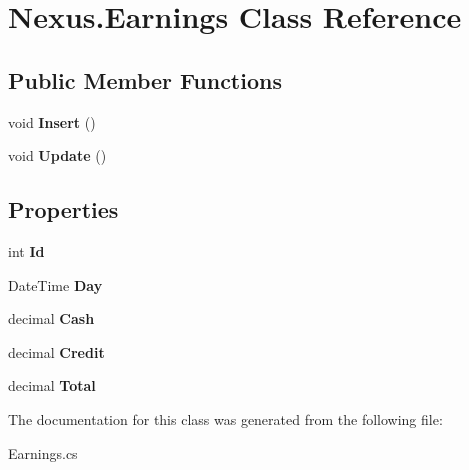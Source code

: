 \hypertarget{class_nexus_1_1_earnings}{}\section{Nexus.\+Earnings Class Reference}
\label{class_nexus_1_1_earnings}
\subsection*{Public Member Functions}
\begin{DoxyCompactItemize}
\item 
\mbox{\label{class_nexus_1_1_earnings_aea1a15de1d4361faf5cce3c17263c9ea}} 
void {\bfseries Insert} ()
\item 
\mbox{\label{class_nexus_1_1_earnings_ae07a47426e5c38a3cf5039ca7035e388}} 
void {\bfseries Update} ()
\end{DoxyCompactItemize}
\subsection*{Properties}
\begin{DoxyCompactItemize}
\item 
\mbox{\label{class_nexus_1_1_earnings_ab14b338e6a7e0995f8a213df8f59ba47}} 
int {\bfseries Id}
\item 
\mbox{\label{class_nexus_1_1_earnings_a5ffed8f40e5e7f6a08c4b7632e8d2558}} 
Date\+Time {\bfseries Day}
\item 
\mbox{\label{class_nexus_1_1_earnings_af7d41b9b56c25bfa2854dc8d1e258ea8}} 
decimal {\bfseries Cash}
\item 
\mbox{\label{class_nexus_1_1_earnings_ad71153833abb3049109a77ccb741299f}} 
decimal {\bfseries Credit}
\item 
\mbox{\label{class_nexus_1_1_earnings_a371223a44b6a567b92e9d1df6998c4dd}} 
decimal {\bfseries Total}
\end{DoxyCompactItemize}


The documentation for this class was generated from the following file\+:\begin{DoxyCompactItemize}
\item 
Earnings.\+cs\end{DoxyCompactItemize}
